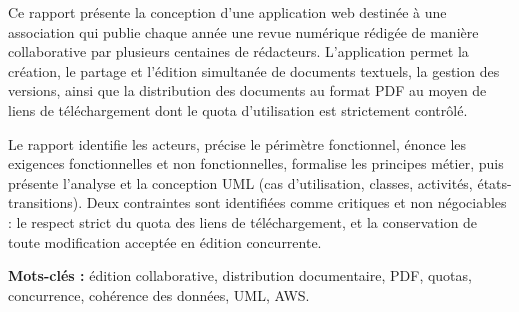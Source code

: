 \documentclass[11pt,a4paper]{report}
\begin{document}
Ce rapport présente la conception d'une application web destinée à une association qui publie chaque année une revue numérique rédigée de manière collaborative par plusieurs centaines de rédacteurs. L'application permet la création, le partage et l'édition simultanée de documents textuels, la gestion des versions, ainsi que la distribution des documents au format PDF au moyen de liens de téléchargement dont le quota d'utilisation est strictement contrôlé.

Le rapport identifie les acteurs, précise le périmètre fonctionnel, énonce les exigences fonctionnelles et non fonctionnelles, formalise les principes métier, puis présente l'analyse et la conception UML (cas d'utilisation, classes, activités, états-transitions). Deux contraintes sont identifiées comme critiques et non négociables : le respect strict du quota des liens de téléchargement, et la conservation de toute modification acceptée en édition concurrente.

\vspace{0.5cm}
\noindent\textbf{Mots-clés :} édition collaborative, distribution documentaire, PDF, quotas, concurrence, cohérence des données, UML, AWS.

\tableofcontents
{}

\listoffigures
{}

\listoftables
{}

\clearpage

\setcounter{page}{1}












\end{document}

